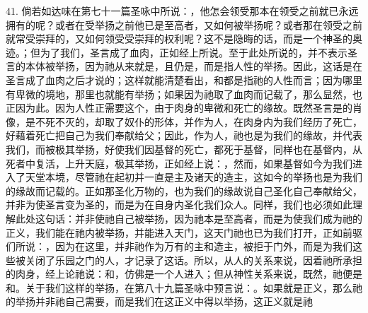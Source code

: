 41. 倘若如达味在第七十一篇圣咏中所说：，他怎会领受那本在领受之前就已永远拥有的呢？或者在受举扬之前他已是至高者，又如何被举扬呢？或者那在领受之前就常受崇拜的，又如何领受受崇拜的权利呢？这不是隐晦的话，而是一个神圣的奥迹。；但为了我们，圣言成了血肉，正如经上所说。至于此处所说的，并不表示圣言的本体被举扬，因为祂从来就是，且仍是，而是指人性的举扬。因此，这话是在圣言成了血肉之后才说的；这样就能清楚看出，和都是指祂的人性而言；因为哪里有卑微的境地，那里也就能有举扬；如果因为祂取了血肉而记载了，那么显然，也正因为此。因为人性正需要这个，由于肉身的卑微和死亡的缘故。既然圣言是的肖像，是不死不灭的，却取了奴仆的形体，并作为人，在肉身内为我们经历了死亡，好藉着死亡把自己为我们奉献给父；因此，作为人，祂也是为我们的缘故，并代表我们，而被极其举扬，好使我们因基督的死亡，都死于基督，同样也在基督内，从死者中复活，上升天庭，极其举扬，正如经上说：，然而，如果基督如今为我们进入了天堂本境，尽管祂在起初并一直是主及诸天的造主，这如今的举扬也是为我们的缘故而记载的。正如那圣化万物的，也为我们的缘故说自己圣化自己奉献给父，并非为使圣言变为圣的，而是为在自身内圣化我们众人。同样，我们也必须如此理解此处这句话：并非使祂自己被举扬，因为祂本是至高者，而是为使我们成为祂的正义，我们能在祂内被举扬，并能进入天门，这天门祂也已为我们打开，正如前驱们所说：，因为在这里，并非祂作为万有的主和造主，被拒于门外，而是为我们这些被关闭了乐园之门的人，才记录了这话。所以，从人的关系来说，因着祂所承担的肉身，经上论祂说：和，仿佛是一个人进入；但从神性关系来说，既然，祂便是和。关于我们这样的举扬，在第八十九篇圣咏中预言说：。如果就是正义，那么祂的举扬并非祂自己需要，而是我们在这正义中得以举扬，这正义就是祂\par

